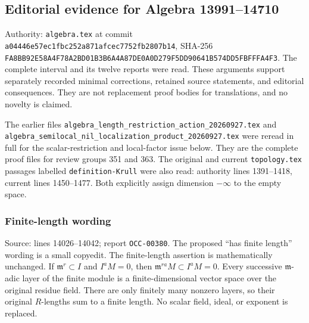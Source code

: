 \subsection{Editorial evidence for Algebra 13991--14710}\label{algebra-proof-003-editorial-evidence-for-algebra-1399114710}

Authority: \texttt{algebra.tex} at commit \texttt{a044\allowbreak{}46e5\allowbreak{}7ec1\allowbreak{}fbc2\allowbreak{}52a8\allowbreak{}71af\allowbreak{}cec7\allowbreak{}752f\allowbreak{}b280\allowbreak{}7b14}, SHA-256 \texttt{FA8B\allowbreak{}B92E\allowbreak{}58A4\allowbreak{}F78A\allowbreak{}2BD0\allowbreak{}1B3B\allowbreak{}6A4A\allowbreak{}87DE\allowbreak{}0A0D\allowbreak{}279F\allowbreak{}5DD9\allowbreak{}0641\allowbreak{}B574\allowbreak{}DD5F\allowbreak{}BFFF\allowbreak{}A4F3}. The complete interval and its twelve reports were read. These arguments support separately recorded minimal corrections, retained source statements, and editorial consequences. They are not replacement proof bodies for translations, and no novelty is claimed.

The earlier files \texttt{algebra\_\allowbreak{}length\_\allowbreak{}restriction\_\allowbreak{}action\_\allowbreak{}20260927.\allowbreak{}tex} and \texttt{algebra\_\allowbreak{}semilocal\_\allowbreak{}nil\_\allowbreak{}localization\allowbreak{}\_\allowbreak{}product\_\allowbreak{}20260927.\allowbreak{}tex} were reread in full for the scalar-restriction and local-factor issue below. They are the complete proof files for review groups 351 and 363. The original and current \texttt{topology.tex} passages labelled \texttt{definition-\AlgebraIdentifierBreak{}Krull} were also read: authority lines 1391--1418, current lines 1450--1477. Both explicitly assign dimension \(-\infty\) to the empty space.

\subsubsection{Finite-length wording}\label{algebra-proof-003-finite-length-wording}

Source: lines 14026--14042; report \texttt{OCC-00380}. The proposed ``has finite length'' wording is a small copyedit. The finite-length assertion is mathematically unchanged. If \(\mathfrak m^r\subset I\) and \(I^aM=0\), then \(\mathfrak m^{ra}M\subset I^aM=0\). Every successive \(\mathfrak m\)-adic layer of the finite module is a finite-dimensional vector space over the original residue field. There are only finitely many nonzero layers, so their original \(R\)-lengths sum to a finite length. No scalar field, ideal, or exponent is replaced.

